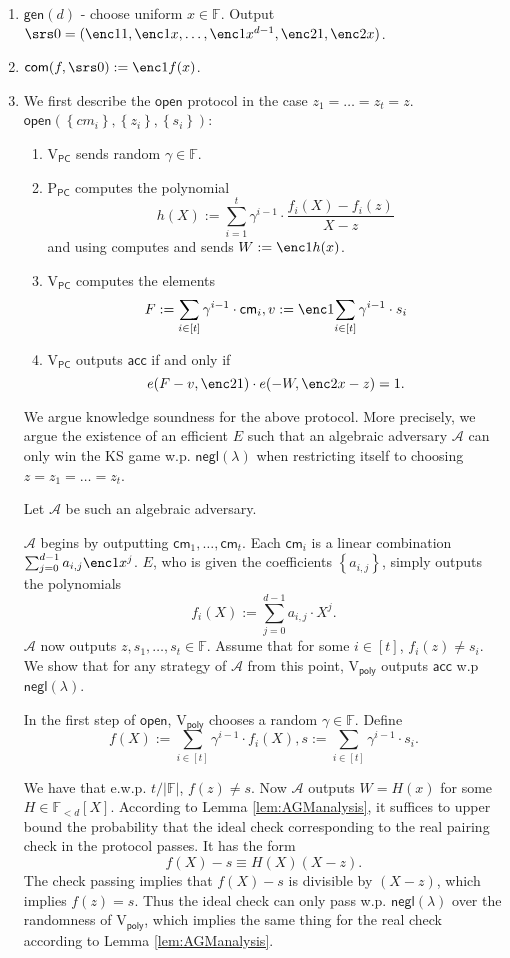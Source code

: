 \documentclass[11pt]{article} %
\newcommand{\F}{\ensuremath{\mathbb F}\xspace}
\newcommand{\adv}{\ensuremath{\mathcal A}\xspace}
\newcommand{\com}{\ensuremath{\mathsf{com}}\xspace}
\newcommand{\cm}{\ensuremath{\mathsf{cm}}\xspace}
\newcommand{\open}{\ensuremath{\mathsf{open}}\xspace}
\newcommand{\negl}{\ensuremath{\mathsf{negl}(\lambda)}\xspace}
\newcommand{\acc}{\ensuremath{\mathsf{acc}}\xspace}
\newcommand{\defeq}{:=}
\newcommand{\gen}{\ensuremath{\mathsf{gen}}\xspace}
\newcommand{\prvpc}{\ensuremath{\mathrm{P_{\mathsf{PC}}}}\xspace}
\newcommand{\verpoly}{\ensuremath{\mathrm{V_{\mathsf{poly}}}}\xspace}
\newcommand{\verpc}{\ensuremath{\mathrm{V_{\mathsf{PC}}}}\xspace}
\newcommand{\ext}{\ensuremath{E}\xspace}
\newcommand{\set}[1]{\ensuremath{\left\{#1\right\}}\xspace}
\newcommand{\polysofdeg}[1]{\ensuremath{\F_{< #1}[X]}\xspace}
\begin{document}
\begin{enumerate}
 \item $\gen(d)$ - choose uniform $x\in \F$. Output $\srs0 =(\enc1{1},\enc1{x},\ldots,\enc1{x^{d-1}},\enc2{1},\enc2{x})$.
 \item $\com(f,\srs0) \defeq \enc1{f(x)}$.
 \item We first describe the \open protocol in the case $z_1=\ldots=z_t=z$.\\
 \noindent
 $\open(\set{cm_i},\set{z_i},\set{s_i})$:
 \begin{enumerate}
  \item \verpc sends random $\gamma\in \F$.
 \item \prvpc computes the polynomial
 \[h(X)\defeq \sum_{i=1}^t \gamma^{i-1}\cdot \frac{f_i(X)-f_i(z)}{X-z}  \]
 and using  computes and sends $W\defeq \enc1{h(x)}$.
 \item\label{step:computeW} \verpc computes the elements 
 \[F\defeq \sum_{i\in [t]} \gamma^{i-1} \cdot \cm_i, v\defeq \enc1{\sum_{i\in [t]} \gamma^{i-1}\cdot s_i}\]
 \item \verpc outputs \acc if and only if
 \[ e(F-v,\enc2{1})\cdot e(-W,\enc2{x-z} )=1. \]
 \end{enumerate}

 We argue knowledge soundness for the above protocol. More precisely, we argue the existence of an efficient \ext such that an algebraic adversary \adv can only win the KS game w.p. \negl when restricting itself to choosing $z=z_1=\ldots=z_t$.
 
 
 Let \adv be such an algebraic adversary.
 
 \adv begins by outputting $\cm_1,\ldots,\cm_t$.
 Each $\cm_i$ is a linear combination $\sum_{j=0}^{d-1} a_{i,j} \enc1{x^j}$.
 \ext, who is given the coefficients \set{a_{i,j}}, simply outputs the polynomials
 \[f_i(X)\defeq \sum_{j=0}^{d-1} a_{i,j} \cdot X^j.\]
 \adv now outputs $z,s_1,\ldots,s_t\in \F$.
  Assume that for some $i\in [t]$, $f_i(z)\neq s_i$. We show that for any strategy of \adv from this point, \verpoly outputs \acc w.p \negl.
 
 In the first step of \open, \verpoly chooses a random $\gamma \in \F$.
 Define 
 \[f(X)\defeq \sum_{i\in [t]} \gamma^{i-1} \cdot f_i(X), s\defeq \sum_{i\in [t]} \gamma^{i-1} \cdot s_i.\]
 
 We have that e.w.p. $t/|\F|$, $f(z)\neq s$.
 Now \adv outputs $W=H(x)$ for some $H\in\polysofdeg{d}$.
 According to Lemma \ref{lem:AGManalysis}, it suffices to upper bound the probability that the ideal check corresponding to the real pairing check in the protocol passes. It has the form
 \[f(X)-s \equiv H(X)(X-z).\]
 The check passing implies that
 $f(X)-s$ is divisible by $(X-z)$, which implies $f(z)=s$. Thus the ideal check can only pass w.p.  \negl over the randomness of \verpoly, which implies the same thing for the real check according to Lemma \ref{lem:AGManalysis}.
 

\end{enumerate}
\end{document}
